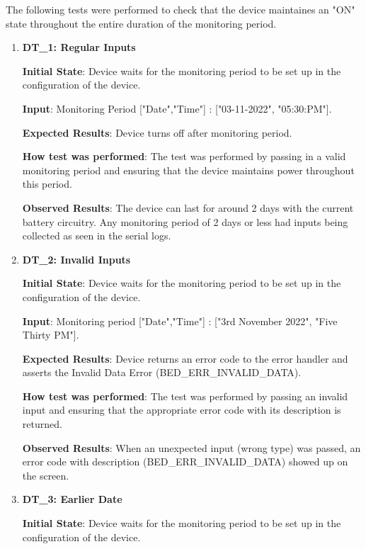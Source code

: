 \documentclass[12pt, titlepage]{article}
\begin{document}
The following tests were performed to check that the device maintaines an "ON" state throughout the entire duration of the monitoring period.
\begin{enumerate}

  \item{\textbf{DT\_1: Regular Inputs}\\}\label{DT1}

  \textbf{Initial State}: Device waits for the monitoring period to be set up in the configuration of the device.

  \textbf{Input}: Monitoring Period ["Date","Time"]  : ["03-11-2022", "05:30:PM"].

  \textbf{Expected Results}: Device turns off after monitoring period.

  \textbf{How test was performed}: The test was performed by passing in a valid monitoring period and ensuring that the device maintains power throughout this period.

  \textbf{Observed Results}: The device can last for around 2 days with the current battery circuitry. Any monitoring period of 2 days or less had inputs being collected as seen in the serial logs.

  \item{\textbf{DT\_2: Invalid Inputs}\\}\label{DT2}

  \textbf{Initial State}: Device waits for the monitoring period to be set up in the configuration of the device.

  \textbf{Input}: Monitoring period ["Date","Time"] : ["3rd November 2022", "Five Thirty PM"].

  \textbf{Expected Results}: Device returns an error code to the error handler and asserts the Invalid Data Error (BED\_ERR\_INVALID\_DATA).

  \textbf{How test was performed}: The test was performed by passing an invalid input and ensuring that the appropriate error code with its description is returned.

  \textbf{Observed Results}: When an unexpected input (wrong type) was passed, an error code with description (BED\_ERR\_INVALID\_DATA) showed up on the screen.

  \item{\textbf{DT\_3: Earlier Date}\\}\label{DT3}

  \textbf{Initial State}: Device waits for the monitoring period to be set up in the configuration of the device.


\end{enumerate}
\end{document}
